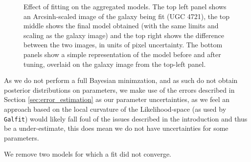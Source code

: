 \documentclass[../main.tex]{subfiles}
\begin{document}
\begin{figure*}
  \caption{Effect of fitting on the aggregated models. The top left panel shows an Arcsinh-scaled image of the galaxy being fit (UGC 4721), the top middle shows the final model obtained (with the same limits and scaling as the galaxy image) and the top right shows the difference between the two images, in units of pixel uncertainty. The bottom panels show a simple representation of the model before and after tuning, overlaid on the galaxy image from the top-left panel.}
  \label{fig:model_tuning}
\end{figure*}

As we do not perform a full Bayesian minimzation, and as such do not obtain posterior distributions on parameters, we make use of the errors described in Section \ref{sec:error_estimation} as our parameter uncertainties, as we feel an approach based on the local curvature of the Likelihood-space (as used by \texttt{Galfit}) would likely fall foul of the issues described in the introduction and thus be a under-estimate, this does mean we do not have uncertainties for some parameters.

We remove two models for which a fit did not converge.
\end{document}
